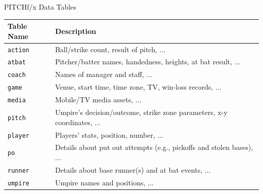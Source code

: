 \begin{frame}{PITCHf/x Data Tables}

\small

\begin{table}[ht]
\centering
\begin{tabular}{ll}
\hline
Table Name & Description \\ 
\hline
{\texttt{action}} & Ball/strike count, result of pitch, ... \\ 
{\texttt{atbat}} & Pitcher/batter names, handedness, heights, at bat result, ... \\ 
{\texttt{coach}} & Names of manager and staff, ... \\ 
{\texttt{game}} & Venue, start time, time zone, TV, win-loss records, ... \\ 
{\texttt{media}} & Mobile/TV media assets, ... \\ 
{\texttt{pitch}} & Umpire's decision/outcome, strike zone parameters, x-y coordinates, ... \\ 
{\texttt{player}} & Players' stats, position, number, ... \\ 
{\texttt{po}} & Details about put out attempts (e.g., pickoffs and stolen bases), ... \\ 
{\texttt{runner}} & Details about base runner(s) and at bat events, ... \\ 
{\texttt{umpire}} & Umpire names and positions, ... \\ 
\hline
\end{tabular}
\end{table}

\end{frame}

